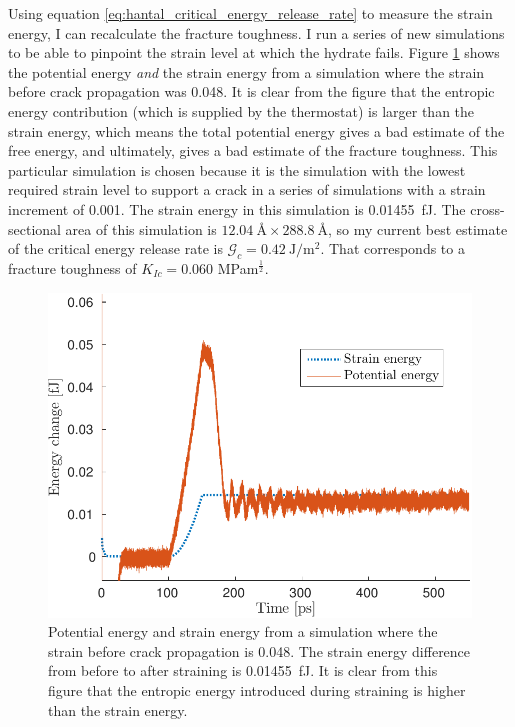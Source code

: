 Using equation \ref{eq:hantal_critical_energy_release_rate} to measure the strain energy, I can recalculate the fracture toughness. I run a series of new simulations to be able to pinpoint the strain level at which the hydrate fails. Figure \ref{fig:pot_strain_eng_l1} shows the potential energy \emph{and} the strain energy from a simulation where the strain before crack propagation was 0.048. It is clear from the figure that the entropic energy contribution (which is supplied by the thermostat) is larger than the strain energy, which means the total potential energy gives a bad estimate of the free energy, and ultimately, gives a bad estimate of the fracture toughness. This particular simulation is chosen because it is the simulation with the lowest required strain level to support a crack in a series of simulations with a strain increment of 0.001. The strain energy in this simulation is \SI{0.01455}{\femto\joule}. The cross-sectional area of this simulation is $\SI{12.04}{\angstrom} \times \SI{288.8}{\angstrom}$, so my current best estimate of the critical energy release rate is $\mathcal{G}_c = \SI{0.42}{\joule\per\meter\squared}$. That corresponds to a fracture toughness of $K_{Ic} = 0.060$ MPam$^\frac{1}{2}$.



\begin{figure}
\centering
\includegraphics[width=12cm]{../figures/thesis/pot_strain_eng_24_24_1.pdf}
\caption{Potential energy and strain energy from a simulation where the strain before crack propagation is 0.048. The strain energy difference from before to after straining is \SI{0.01455}{\femto\joule}. It is clear from this figure that the entropic energy introduced during straining is higher than the strain energy.}
\label{fig:pot_strain_eng_l1}
\end{figure} 

